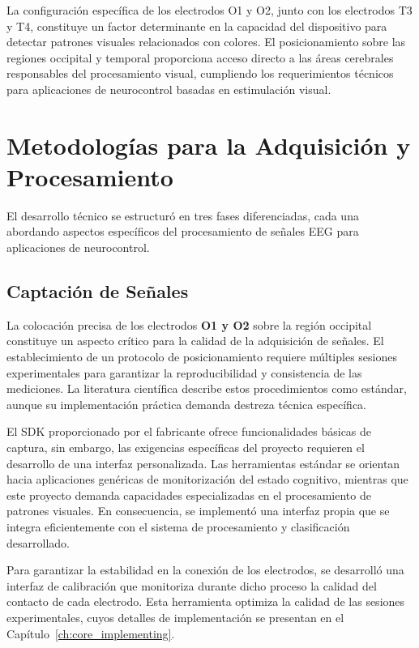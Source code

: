 La configuración específica de los electrodos O1 y O2, junto con los electrodos T3 y T4, constituye un factor determinante en la capacidad del dispositivo para detectar patrones visuales relacionados con colores. El posicionamiento sobre las regiones occipital y temporal proporciona acceso directo a las áreas cerebrales responsables del procesamiento visual, cumpliendo los requerimientos técnicos para aplicaciones de neurocontrol basadas en estimulación visual.

\section{Metodologías para la Adquisición y Procesamiento}
El desarrollo técnico se estructuró en tres fases diferenciadas, cada una abordando aspectos específicos del procesamiento de señales EEG para aplicaciones de neurocontrol.

    \subsection{Captación de Señales}
    La colocación precisa de los electrodos \textbf{O1 y O2} sobre la región occipital constituye un aspecto crítico para la calidad de la adquisición de señales. El establecimiento de un protocolo de posicionamiento requiere múltiples sesiones experimentales para garantizar la reproducibilidad y consistencia de las mediciones. La literatura científica describe estos procedimientos como estándar, aunque su implementación práctica demanda destreza técnica específica.
    
    El SDK proporcionado por el fabricante ofrece funcionalidades básicas de captura, sin embargo, las exigencias específicas del proyecto requieren el desarrollo de una interfaz personalizada. Las herramientas estándar se orientan hacia aplicaciones genéricas de monitorización del estado cognitivo, mientras que este proyecto demanda capacidades especializadas en el procesamiento de patrones visuales. En consecuencia, se implementó una interfaz propia que se integra eficientemente con el sistema de procesamiento y clasificación desarrollado.
    
    Para garantizar la estabilidad en la conexión de los electrodos, se desarrolló una interfaz de calibración que monitoriza durante dicho proceso la calidad del contacto de cada electrodo. Esta herramienta optimiza la calidad de las sesiones experimentales, cuyos detalles de implementación se presentan en el Capítulo~\ref{ch:core_implementing}.

